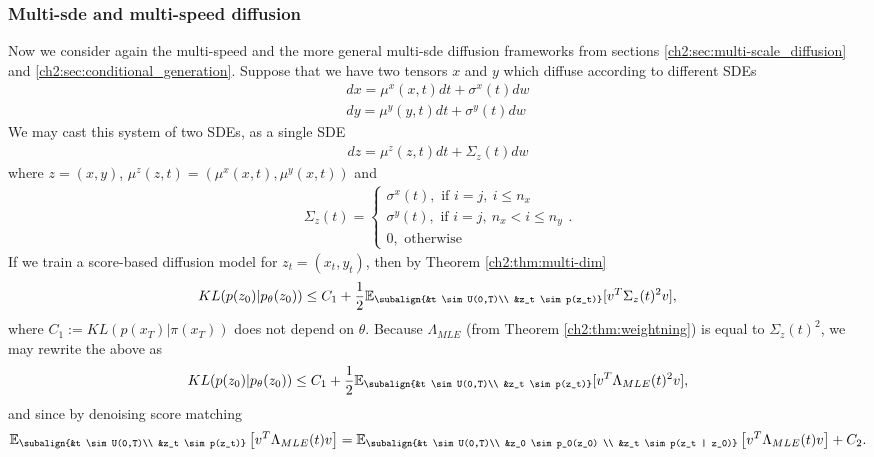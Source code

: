 \subsubsection{Multi-sde and multi-speed diffusion}
Now we consider again the multi-speed and the more general multi-sde diffusion frameworks from sections \ref{ch2:sec:multi-scale_diffusion} and \ref{ch2:sec:conditional_generation}. Suppose that we have two tensors $x$ and $y$ which diffuse according to different SDEs
\begin{gather*}
    dx = \mu^x(x,t)dt+\sigma^x(t)dw  \\
    dy = \mu^y(y,t)dt+\sigma^y(t)dw  
\end{gather*}
We may cast this system of two SDEs, as a single SDE
\begin{gather*}
    dz = \mu^z(z,t)dt+ \Sigma_z(t)dw 
\end{gather*}
where $z = (x,y)$, $\mu^z(z,t) = (\mu^x(x,t), \mu^y(x,t))$ and 
\begin{gather*}
    \Sigma_z(t) =  
    \begin{cases} 
        \sigma^x(t), \text{ if } i=j, \ i \leq n_x \\ 
        \sigma^y(t), \text{ if } i=j, \ n_x < i \leq n_y  \\
        0, \text{ otherwise}
    \end{cases}
    .            
\end{gather*}
If we train a score-based diffusion model for $z_t = (x_t, y_t)$, then by Theorem \ref{ch2:thm:multi-dim}
\begin{align*}
    KL(p(z_0) | p_\theta(z_0)) \leq C_1 + \frac{1}{2} \mathbb{E}_{\subalign{&t \sim U(0,T)\\ &z_t \sim p(z_t)}} 
    [
        v^T \Sigma_z(t)^2 v
    ],
\end{align*}
where $C_1 := KL(p(x_T) | \pi(x_T)) $ does not depend on $\theta$.
Because $\Lambda_{MLE}$ (from Theorem \ref{ch2:thm:weightning}) is equal to $\Sigma_z(t)^2$, we may rewrite the above as 
\begin{align*}
    KL(p(z_0) | p_\theta(z_0)) \leq C_1 + \frac{1}{2} \mathbb{E}_{\subalign{&t \sim U(0,T)\\ &z_t \sim p(z_t)}} 
    [
        v^T \Lambda_{MLE}(t)^2 v
    ],
\end{align*}
and since by denoising score matching \cite{vincent2011connection} 
\begin{equation}
    \mathbb{E}_{\subalign{&t \sim U(0,T)\\ &z_t \sim p(z_t)}} \left[ v^T \Lambda_{MLE}(t) v \right] = \mathbb{E}_{\subalign{&t \sim U(0,T)\\ &z_0 \sim p_0(z_0) \\ &z_t \sim p(z_t | z_0)}} \left[ v^T \Lambda_{MLE}(t) v \right] + C_2.
\end{equation}

